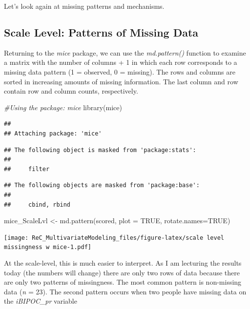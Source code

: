 \documentclass[
  english,
]{book}
\newenvironment{Shaded}{\begin{snugshade}}{\end{snugshade}}
\newcommand{\AttributeTok}[1]{\textcolor[rgb]{0.77,0.63,0.00}{#1}}
\newcommand{\CommentTok}[1]{\textcolor[rgb]{0.56,0.35,0.01}{\textit{#1}}}
\newcommand{\ConstantTok}[1]{\textcolor[rgb]{0.00,0.00,0.00}{#1}}
\newcommand{\FunctionTok}[1]{\textcolor[rgb]{0.00,0.00,0.00}{#1}}
\newcommand{\NormalTok}[1]{#1}
\newcommand{\OtherTok}[1]{\textcolor[rgb]{0.56,0.35,0.01}{#1}}
\begin{document}
Let's look again at missing patterns and mechanisms.

\hypertarget{scale-level-patterns-of-missing-data}{%
\subsection{Scale Level: Patterns of Missing Data}\label{scale-level-patterns-of-missing-data}}

Returning to the \emph{mice} package, we can use the \emph{md.pattern()} function to examine a matrix with the number of columns + 1 in which each row corresponds to a missing data pattern (1 = observed, 0 = missing). The rows and columns are sorted in increasing amounts of missing information. The last column and row contain row and column counts, respectively.

\begin{Shaded}
\begin{Highlighting}[]
\CommentTok{\#Using the package: mice}
\FunctionTok{library}\NormalTok{(mice)}
\end{Highlighting}
\end{Shaded}

\begin{verbatim}
## 
## Attaching package: 'mice'
\end{verbatim}

\begin{verbatim}
## The following object is masked from 'package:stats':
## 
##     filter
\end{verbatim}

\begin{verbatim}
## The following objects are masked from 'package:base':
## 
##     cbind, rbind
\end{verbatim}

\begin{Shaded}
\begin{Highlighting}[]
\NormalTok{mice\_ScaleLvl }\OtherTok{\textless{}{-}} \FunctionTok{md.pattern}\NormalTok{(scored, }\AttributeTok{plot =} \ConstantTok{TRUE}\NormalTok{, }\AttributeTok{rotate.names=}\ConstantTok{TRUE}\NormalTok{)}
\end{Highlighting}
\end{Shaded}

\texttt{[image: ReC\_MultivariateModeling\_files/figure-latex/scale level missingness w mice-1.pdf]}

At the scale-level, this is much easier to interpret. As I am lecturing the results today (the numbers will change) there are only two rows of data because there are only two patterns of missingness. The most common pattern is non-missing data (\emph{n} = 23). The second pattern occurs when two people have missing data on the \emph{iBIPOC\_pr} variable
\end{document}
